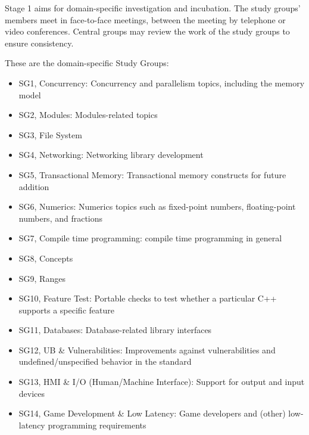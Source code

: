 

Stage 1 aims for domain-specific investigation and incubation. The study groups’ members meet in face-to-face meetings, between the meeting by telephone or video conferences. Central groups may review the work of the study groups to ensure consistency.

These are the domain-specific Study Groups:

\begin{itemize}
\item 
SG1, Concurrency: Concurrency and parallelism topics, including the memory model

\item 
SG2, Modules: Modules-related topics

\item 
SG3, File System

\item 
SG4, Networking: Networking library development

\item 
SG5, Transactional Memory: Transactional memory constructs for future addition

\item 
SG6, Numerics: Numerics topics such as fixed-point numbers, floating-point numbers, and fractions

\item 
SG7, Compile time programming: compile time programming in general

\item 
SG8, Concepts

\item 
SG9, Ranges

\item 
SG10, Feature Test: Portable checks to test whether a particular C++ supports a specific feature

\item 
SG11, Databases: Database-related library interfaces

\item 
SG12, UB \& Vulnerabilities: Improvements against vulnerabilities and undefined/unspecified
behavior in the standard

\item 
SG13, HMI \& I/O (Human/Machine Interface): Support for output and input devices

\item 
SG14, Game Development \& Low Latency: Game developers and (other) low-latency programming requirements


\end{itemize}
